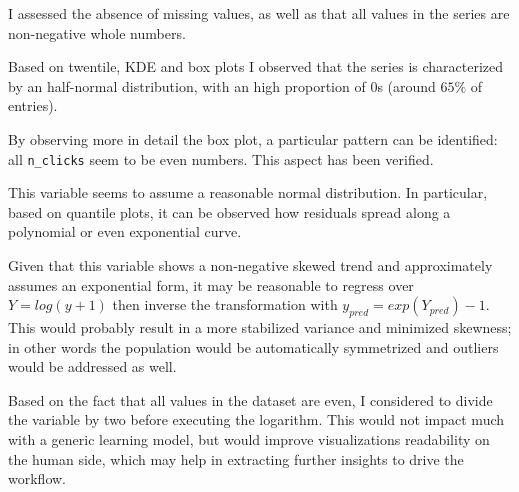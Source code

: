 \documentclass[preprint,12pt,3p]{elsarticle}
\begin{document}
I assessed the absence of missing values, as well as that all values in the series are non-negative whole numbers.

Based on twentile, KDE and box plots I observed that the series is characterized by an half-normal distribution, with an high proportion of $0$s (around $65\%$ of entries).

By observing more in detail the box plot, a particular pattern can be identified: all \verb|n_clicks| seem to be even numbers. This aspect has been verified.

This variable seems to assume a reasonable normal distribution. In particular, based on quantile plots, it can be observed how residuals spread along a polynomial or even exponential curve. 

Given that this variable shows a non-negative skewed trend and approximately assumes an exponential form, it may be reasonable to regress over $Y=log(y+1)$ then inverse the transformation with $y_{pred}=exp(Y_{pred})-1$. This would probably result in a more stabilized variance and minimized skewness; in other words the population would be automatically symmetrized and outliers would be addressed as well.

Based on the fact that all values in the dataset are even, I considered to divide the variable by two before executing the logarithm. This would not impact much with a generic learning model, but would improve visualizations readability on the human side, which may help in extracting further insights to drive the workflow.
\end{document}
